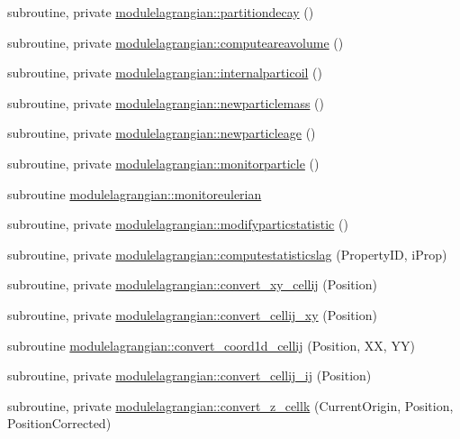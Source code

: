 \begin{DoxyCompactItemize}
\item 
subroutine, private \mbox{\hyperlink{namespacemodulelagrangian_ad1541366b9db02d7a143f29f81d45a3d}{modulelagrangian\+::partitiondecay}} ()
\item 
subroutine, private \mbox{\hyperlink{namespacemodulelagrangian_a5a4818cc1397ad3373693bc882af863f}{modulelagrangian\+::computeareavolume}} ()
\item 
subroutine, private \mbox{\hyperlink{namespacemodulelagrangian_a370ee1f0e073c2f783b4f91c7aee40f1}{modulelagrangian\+::internalparticoil}} ()
\item 
subroutine, private \mbox{\hyperlink{namespacemodulelagrangian_a5afe5f1c46e068854f5c2eca0de8b0fb}{modulelagrangian\+::newparticlemass}} ()
\item 
subroutine, private \mbox{\hyperlink{namespacemodulelagrangian_a05769d5d8e2cad0d654788eda4c8830e}{modulelagrangian\+::newparticleage}} ()
\item 
subroutine, private \mbox{\hyperlink{namespacemodulelagrangian_a71a2aeb4e1c33422d4189e27f77e15e6}{modulelagrangian\+::monitorparticle}} ()
\item 
subroutine \mbox{\hyperlink{namespacemodulelagrangian_ad6a4bcc42c67f187fb3a812f39b8c751}{modulelagrangian\+::monitoreulerian}}
\item 
subroutine, private \mbox{\hyperlink{namespacemodulelagrangian_a101763d65fb26cd32c402a807ae7c733}{modulelagrangian\+::modifyparticstatistic}} ()
\item 
subroutine, private \mbox{\hyperlink{namespacemodulelagrangian_afbe53c51100e0ccf05c86c57cde70d49}{modulelagrangian\+::computestatisticslag}} (Property\+ID, i\+Prop)
\item 
subroutine, private \mbox{\hyperlink{namespacemodulelagrangian_ac9070324e55670920f08443dd42938d9}{modulelagrangian\+::convert\+\_\+xy\+\_\+cellij}} (Position)
\item 
subroutine, private \mbox{\hyperlink{namespacemodulelagrangian_afc4e34e45162b06f3c0a80ae1e000fe8}{modulelagrangian\+::convert\+\_\+cellij\+\_\+xy}} (Position)
\item 
subroutine \mbox{\hyperlink{namespacemodulelagrangian_a7675e0420886642ca2fa921c21fdaca5}{modulelagrangian\+::convert\+\_\+coord1d\+\_\+cellij}} (Position, XX, YY)
\item 
subroutine, private \mbox{\hyperlink{namespacemodulelagrangian_acf4d2d03d6e5a08dbd6f22a256ca3d91}{modulelagrangian\+::convert\+\_\+cellij\+\_\+ij}} (Position)
\item 
subroutine, private \mbox{\hyperlink{namespacemodulelagrangian_a457d6182588e8e1d9cc86c35a53690f7}{modulelagrangian\+::convert\+\_\+z\+\_\+cellk}} (Current\+Origin, Position, Position\+Corrected)

\end{DoxyCompactItemize}
